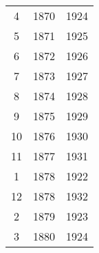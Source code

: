 % 
\begin{tabular}{ccc}
  \hline
  \hline
4 & 1870 & 1924 \\ 
  5 & 1871 & 1925 \\ 
  6 & 1872 & 1926 \\ 
  7 & 1873 & 1927 \\ 
  8 & 1874 & 1928 \\ 
  9 & 1875 & 1929 \\ 
  10 & 1876 & 1930 \\ 
  11 & 1877 & 1931 \\ 
  1 & 1878 & 1922 \\ 
  12 & 1878 & 1932 \\ 
  2 & 1879 & 1923 \\ 
  3 & 1880 & 1924 \\ 
   \hline
\end{tabular}
